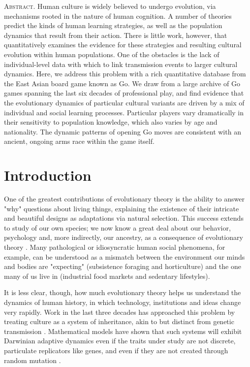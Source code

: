 \documentclass[reqno,12pt]{amsart}
\begin{document}
\noindent\textsc{Abstract.}
Human culture is widely believed to undergo evolution, via mechanisms rooted in the nature of human cognition. A number of theories predict the kinds of human learning strategies, as well as the population dynamics that result from their action. There is little work, however, that quantitatively examines the evidence for these strategies and resulting cultural evolution within human populations. One of the obstacles is the lack of individual-level data with which to link transmission events to larger cultural dynamics. Here, we address this problem with a rich quantitative database from the East Asian board game known as Go. We draw from a large archive of Go games spanning the last six decades of professional play, and find evidence that the evolutionary dynamics of particular cultural variants are driven by a mix of individual and social learning processes. Particular players vary dramatically in their sensitivity to population knowledge, which also varies by age and nationality. The dynamic patterns of opening Go moves are consistent with an ancient, ongoing arms race within the game itself.

\vspace{12pt}

\vspace{24pt}


\section{Introduction}

One of the greatest contributions of evolutionary theory is the ability to answer "why" questions about living things, explaining the existence of their intricate and beautiful designs as adaptations via natural selection. This success extends to study of our own species; we now know a great deal about our behavior, psychology and, more indirectly, our ancestry, as a consequence of evolutionary theory \citep{barkow1992adaptedmind, laland2002sense}. Many pathological or idiosyncratic human social phenomena, for example, can be understood as a mismatch between the environment our minds and bodies are "expecting" (subsistence foraging and horticulture) and the one many of us live in (industrial food markets and sedentary lifestyles).

It is less clear, though, how much evolutionary theory helps us understand the dynamics of human history, in which technology, institutions and ideas change very rapidly. Work in the last three decades has approached this problem by treating culture as a system of inheritance, akin to but distinct from genetic transmission \citep{durham1992coevolution, richerson2005genesalone}. Mathematical models have shown that such systems will exhibit Darwinian adaptive dynamics even if the traits under study are not discrete, particulate replicators like genes, and even if they are not created through random mutation \citep{boyd1985culture, henrich2002replicators}.
\end{document}
